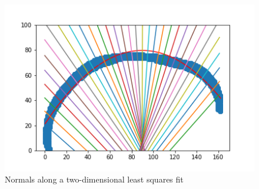 \begin{figure}[]
	\centering
	\includegraphics[width=\linewidth]{./figures/normals}
	\caption{Normals along a two-dimensional least squares fit}
	\label{fig:normals}
\end{figure} 

